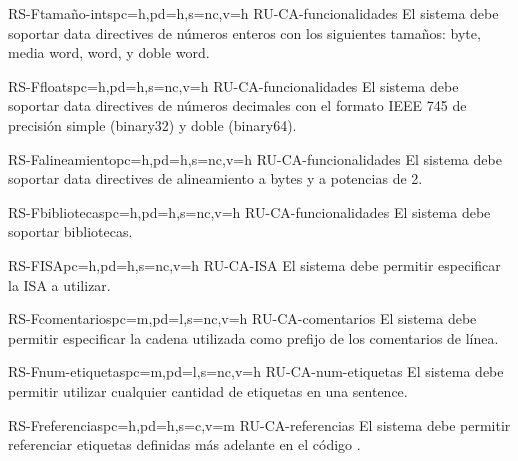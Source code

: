 
\begin{softwareReq}{RS-F}{tamaño-ints}{pc=h,pd=h,s=nc,v=h}
    {RU-CA-funcionalidades}
    El sistema debe soportar \glspl{data directive} de números enteros con los
    siguientes tamaños: byte, media \gls{word}, \gls{word}, y doble \gls{word}.
\end{softwareReq}

\begin{softwareReq}{RS-F}{floats}{pc=h,pd=h,s=nc,v=h}
    {RU-CA-funcionalidades}
    El sistema debe soportar \glspl{data directive} de números decimales con el
    formato IEEE 745 de precisión simple (binary32) y doble (binary64).
\end{softwareReq}

\begin{softwareReq}{RS-F}{alineamiento}{pc=h,pd=h,s=nc,v=h}
    {RU-CA-funcionalidades}
    El sistema debe soportar \glspl{data directive} de alineamiento a bytes y a
    potencias de 2.
\end{softwareReq}

\begin{softwareReq}{RS-F}{bibliotecas}{pc=h,pd=h,s=nc,v=h}
    {RU-CA-funcionalidades}
    El sistema debe soportar bibliotecas. %
\end{softwareReq}

\begin{softwareReq}{RS-F}{ISA}{pc=h,pd=h,s=nc,v=h}
    {RU-CA-ISA}
    El sistema debe permitir especificar la \gls{ISA} a utilizar.
\end{softwareReq}

\begin{softwareReq}{RS-F}{comentarios}{pc=m,pd=l,s=nc,v=h}
    {RU-CA-comentarios}
    El sistema debe permitir especificar la cadena utilizada como prefijo de los
    comentarios de línea.
\end{softwareReq}

\begin{softwareReq}{RS-F}{num-etiquetas}{pc=m,pd=l,s=nc,v=h}
    {RU-CA-num-etiquetas}
    El sistema debe permitir utilizar cualquier cantidad de etiquetas en una
    \gls{sentence}.
\end{softwareReq}

\begin{softwareReq}{RS-F}{referencias}{pc=h,pd=h,s=c,v=m}
    {RU-CA-referencias}
    El sistema debe permitir referenciar etiquetas definidas más adelante en el
    código .
\end{softwareReq}

